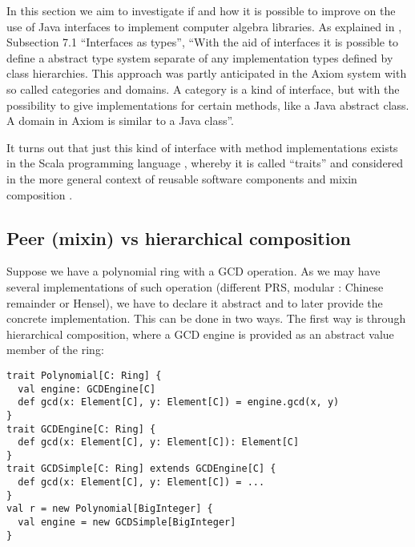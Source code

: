 \documentclass{llncs}
\begin{document}



In this section we aim to investigate if and how it is possible to improve on
the use of Java interfaces to implement computer algebra libraries.
As explained in \cite{Kredel:2008}, Subsection 7.1 ``Interfaces as types'',
``With the aid of interfaces it is possible to define a abstract type system
separate of any implementation types defined by class hierarchies. This approach
was partly anticipated in the Axiom system \cite{JenksSutor:1992} with so called
categories and domains. A category is a kind of interface, but with the
possibility to give implementations for certain methods, like a Java abstract
class. A domain in Axiom is similar to a Java class''.

It turns out that just this kind of interface with method implementations
exists in the Scala programming language \cite{Odersky:2003}, whereby it is
called ``traits'' and considered in the more general context of reusable
software components and mixin composition \cite{Odersky:2005}.

\subsection{Peer (mixin) vs hierarchical composition} %

Suppose we have a polynomial ring with a GCD operation. As we may have several
implementations of such operation (different PRS, modular : Chinese
remainder or Hensel), we have to declare it abstract and to later
provide the concrete implementation. This can be done in two ways. The first
way is through hierarchical composition, where a GCD engine is provided as an
abstract value member of the ring:

\begin{verbatim}
trait Polynomial[C: Ring] {
  val engine: GCDEngine[C]
  def gcd(x: Element[C], y: Element[C]) = engine.gcd(x, y)
}
trait GCDEngine[C: Ring] {
  def gcd(x: Element[C], y: Element[C]): Element[C]
}
trait GCDSimple[C: Ring] extends GCDEngine[C] {
  def gcd(x: Element[C], y: Element[C]) = ...
}
val r = new Polynomial[BigInteger] {
  val engine = new GCDSimple[BigInteger]
}
\end{verbatim}
\end{document}
